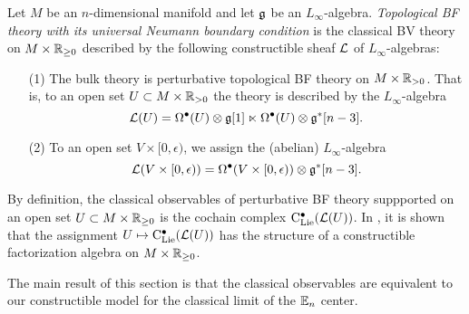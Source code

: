 \documentclass[11pt]{amsart}
\numberwithin{equation}{section}
\begin{document}


\begin{dfn}
Let $M$ be an $n$-dimensional manifold and let $\mathfrak g$ be an $L_\infty$-algebra. 
{\em Topological BF theory with its universal Neumann boundary condition} is the classical BV theory on $M \times \mathbb R_{\geq 0}$ described by the following constructible sheaf $\mathcal L$ of $L_\infty$-algebras:
\begin{itemize}
\item[(1)] 
The bulk theory is perturbative topological BF theory on $M \times \mathbb R_{>0}$. 
That is, to an open set $U \subset M \times \mathbb R_{>0}$ the theory is described by the $L_\infty$-algebra 
\[
\mathcal L (U) = \Omega^{\bullet} (U) \otimes \mathfrak g [1] \ltimes \Omega^{\bullet} (U) \otimes \mathfrak g^* [n-3] .
\]
\item[(2)] 
To an open set $V \times [0,\epsilon)$, we assign the (abelian) $L_\infty$-algebra
\[
\mathcal L (V \times [0,\epsilon)) = \Omega^{\bullet} (V \times [0,\epsilon)) \otimes \mathfrak g^* [n-3] .
\]
\end{itemize}
\end{dfn}

By definition, the classical observables of perturbative BF theory suppported on an open set $U \subset M \times \mathbb R_{\geq 0}$ is the cochain complex ${\rm C}_{\rm Lie}^\bullet (\mathcal L (U))$. 
In \cite{Eugene}, it is shown that the assignment $U \mapsto {\rm C}_{\rm Lie}^\bullet (\mathcal L(U))$ has the structure of a constructible factorization algebra on $M \times \mathbb R_{\geq 0}$. 

The main result of this section is that the classical observables are equivalent to our constructible model for the classical limit of the $\mathbb E_n$ center. 
\end{document}

